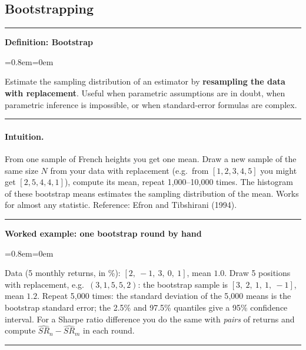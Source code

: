 \documentclass[11pt,a4paper]{report}
\newenvironment{notebox}[1]
  {\par\medskip\Needspace{6\baselineskip}\noindent\rule{\linewidth}{0.4pt}\par\nopagebreak
   \noindent\textbf{#1}\par\nopagebreak
   \begin{list}{}{\leftmargin=0.8em\rightmargin=0em\topsep=2pt}\item[]}
  {\end{list}\nopagebreak\noindent\rule{\linewidth}{0.4pt}\par\medskip}
\newenvironment{definitionbox}[1]{\begin{notebox}{Definition: #1}}{\end{notebox}}
\newenvironment{workedex}[1][]{\begin{notebox}{Worked example#1}}{\end{notebox}}
\begin{document}
\subsection{Bootstrapping}
\begin{definitionbox}{Bootstrap}
Estimate the sampling distribution of an estimator by \textbf{resampling the
data with replacement}. Useful when parametric assumptions are in doubt, when
parametric inference is impossible, or when standard-error formulas are complex.
\end{definitionbox}
\paragraph{Intuition.} From one sample of French heights you get one mean. Draw a
new sample of the same size $N$ from your data with replacement (e.g.\ from
$[1,2,3,4,5]$ you might get $[2,5,4,4,1]$), compute its mean, repeat 1{,}000--10{,}000
times. The histogram of these bootstrap means estimates the sampling
distribution of the mean. Works for almost any statistic. Reference: Efron and
Tibshirani (1994).


\begin{workedex}[: one bootstrap round by hand]
Data (5 monthly returns, in \%): $[2,\ -1,\ 3,\ 0,\ 1]$, mean $1.0$.
Draw 5 positions with replacement, e.g.\ $(3,1,5,5,2)$: the bootstrap sample is
$[3,\ 2,\ 1,\ 1,\ -1]$, mean $1.2$. Repeat 5{,}000 times: the standard deviation
of the 5{,}000 means is the bootstrap standard error; the 2.5\% and 97.5\%
quantiles give a 95\% confidence interval. For a Sharpe ratio difference you do
the same with \emph{pairs} of returns and compute $\widehat{SR}_n-\widehat{SR}_m$
in each round.
\end{workedex}
\end{document}

